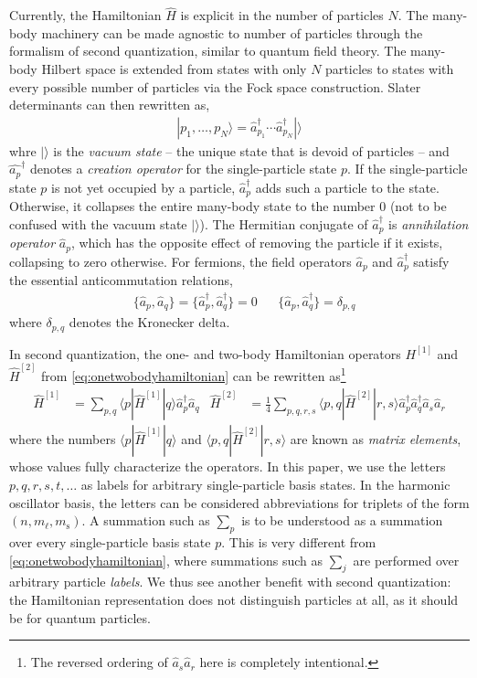 Currently, the Hamiltonian $\hat{H}$ is explicit in the number of particles $N$.  The many-body machinery can be made agnostic to number of particles through the formalism of second quantization, similar to quantum field theory.  The many-body Hilbert space is extended from states with only $N$ particles to states with every possible number of particles via the Fock space construction.  Slater determinants can then rewritten as,
\begin{align*}
  |p_1, \ldots, p_N\rangle =
  \hat a_{p_1}^\dagger \cdots \hat a_{p_N}^\dagger |\rangle
\end{align*}
whre $|\rangle$ is the \textit{vacuum state} -- the unique state that is devoid of particles -- and $\hat{a_p}^\dagger$ denotes a \textit{creation operator} for the single-particle state $p$.  If the single-particle state $p$ is not yet occupied by a particle, $\hat a_p^\dagger$ adds such a particle to the state.  Otherwise, it collapses the entire many-body state to the number $0$ (not to be confused with the vacuum state $|\rangle$).  The Hermitian conjugate of $\hat a_p^\dagger$ is \textit{annihilation operator} $\hat a_p$, which has the opposite effect of removing the particle if it exists, collapsing to zero otherwise.  For fermions, the field operators $\hat a_p$ and $\hat a_p^\dagger$ satisfy the essential anticommutation relations,
\begin{align*}
  &\{\hat a_p, \hat a_q\} = \{\hat a_p^\dagger, \hat a_q^\dagger\} = 0 &
  &\{\hat a_p, \hat a_q^\dagger\} = \delta_{p, q}
\end{align*}
where $\delta_{p, q}$ denotes the Kronecker delta.

In second quantization, the one- and two-body Hamiltonian operators $H^{[1]}$ and $\hat{H}^{[2]}$ from \eqref{eq:onetwobodyhamiltonian} can be rewritten as\footnote{The reversed ordering of $\hat a_s \hat a_r$ here is completely intentional.}
\begin{align} \label{eq:second_quantized_hamiltonian}
  \hat H^{[1]} &= \sum_{p, q} \langle p | \hat{H}^{[1]} | q \rangle \hat a_p^\dagger \hat a_q^{} &
  \hat{H}^{[2]} &= \frac{1}{4} \sum_{p, q, r, s} \langle p, q | \hat{H}^{[2]} | r, s \rangle \hat a_p^\dagger \hat a_q^\dagger \hat a_s^{} \hat a_r^{}
\end{align}
where the numbers $\langle p | \hat{H}^{[1]} | q \rangle$ and $\langle p, q | \hat{H}^{[2]} | r, s \rangle$ are known as \textit{matrix elements}, whose values fully characterize the operators.  In this paper, we use the letters $p, q, r, s, t, \ldots$ as labels for arbitrary single-particle basis states.  In the harmonic oscillator basis, the letters can be considered abbreviations for triplets of the form $(n, m_\ell, m_{\mathrm{s}})$.  A summation such as $\sum_p$ is to be understood as a summation over every single-particle basis state $p$.  This is very different from \eqref{eq:onetwobodyhamiltonian}, where summations such as $\sum_j$ are performed over arbitrary particle \emph{labels}.  We thus see another benefit with second quantization: the Hamiltonian representation does not distinguish particles at all, as it should be for quantum particles.

